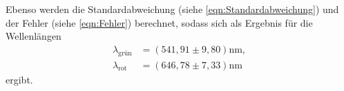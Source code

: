 Ebenso werden die Standardabweichung (siehe \autoref{eqn:Standardabweichung}) und der Fehler (siehe \autoref{eqn:Fehler}) berechnet,
sodass sich als Ergebnis für die Wellenlängen
\begin{align*}
  \lambda_{\text{grün}} &= (541,91 \pm 9,80) \si{\nano\meter},\\
  \lambda_{\text{rot}} &= (646,78 \pm 7,33) \si{\nano\meter}
\end{align*}
ergibt.


